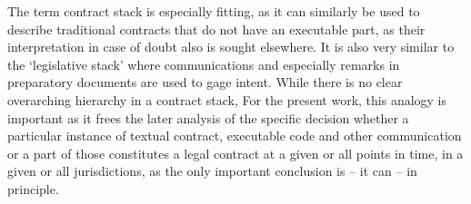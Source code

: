 \documentclass[conference]{IEEEtran}
\begin{document}
The term contract stack is especially fitting, as it can similarly be used to describe traditional contracts that do not have an executable part, as their interpretation in case of doubt also is sought elsewhere.
It is also very similar to the ‘legislative stack’ where communications and especially remarks in preparatory documents are used to gage intent. While there is no clear overarching hierarchy in a contract stack, 
For the present work, this analogy is important as it frees the later analysis of the specific decision whether a particular instance of textual contract, executable code and other communication or a part of those constitutes a legal contract at a given or all points in time, in a given or all jurisdictions, as the only important conclusion is – it can  – in principle.
\end{document}
